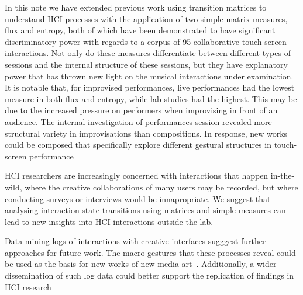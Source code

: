 \documentclass{sigchi}
\begin{document}
In this note we have extended previous work using transition matrices
to understand HCI processes with the application of two simple matrix
measures, flux and entropy, both of which have been demonstrated to
have significant discriminatory power with regards to a corpus of 95
collaborative touch-screen interactions. Not only do these measures
differentiate between different types of sessions and the internal
structure of these sessions, but they have explanatory power that has
thrown new light on the musical interactions under examination. It is
notable that, for improvised performances, live performances had the
lowest measure in both flux and entropy, while lab-studies had the
highest. This may be due to the increased pressure on performers when
improvising in front of an audience. The internal investigation of
performances session revealed more structural variety in
improvisations than compositions. In response, new works could be
composed that specifically explore different gestural structures in
touch-screen performance

HCI researchers are increasingly concerned with interactions that
happen in-the-wild, where the creative collaborations of many users
may be recorded, but where conducting surveys or interviews would be
innapropriate. We suggest that analysing interaction-state transitions
using matrices and simple measures can lead to new insights into HCI
interactions outside the lab.

Data-mining logs of interactions with creative interfaces sugggest
further approaches for future work. The macro-gestures that these
processes reveal could be used as the basis for new works of new media
art~\cite{Manovich:2002ly}. Additionally, a wider dissemination of
such log data could better support the replication of findings in HCI
research~\cite{Wilson:2011ve}



\end{document}
